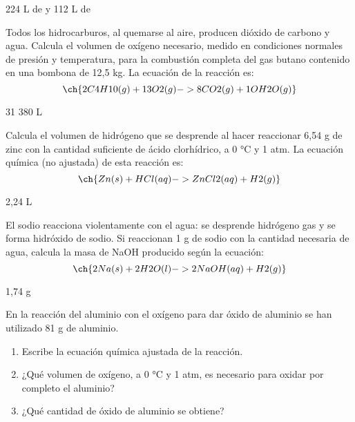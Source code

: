\documentclass[
]{article}
\providecommand{\tightlist}{%
  \setlength{\itemsep}{0pt}\setlength{\parskip}{0pt}}
\begin{document}
\begin{solution}224 L de  y 112 L de \end{solution}

\begin{exercise}[tags=OXF16] Todos los hidrocarburos, al quemarse al
aire, producen dióxido de carbono y agua. Calcula el volumen de oxígeno
necesario, medido en condiciones normales de presión y temperatura, para
la combustión completa del gas butano contenido en una bombona de 12,5
kg. La ecuación de la reacción es:
\[\ch{2 C4H10(g) + 13 O2(g) -> 8 CO2(g) + 1O H2O(g)}\]\end{exercise}

\begin{solution}31 380 L\end{solution}

\begin{exercise}[tags=OXF16] Calcula el volumen de hidrógeno que se
desprende al hacer reaccionar 6,54 g de zinc con la cantidad suficiente
de ácido clorhídrico, a 0 °C y 1 atm. La ecuación química (no ajustada)
de esta reacción es:
\[\ch{Zn(s) + HCl(aq) -> ZnCl2(aq) + H2(g)}\]\end{exercise}

\begin{solution}2,24 L\end{solution}

\begin{exercise}[tags=OXF16] El sodio reacciona violentamente con el
agua: se desprende hidrógeno gas y se forma hidróxido de sodio. Si
reaccionan 1 g de sodio con la cantidad necesaria de agua, calcula la
masa de NaOH producido según la ecuación:
\[\ch{2 Na(s) + 2 H2O(l) -> 2 NaOH(aq) + H2(g)}\]\end{exercise}

\begin{solution}1,74 g\end{solution}

\begin{exercise}[tags=OXF16] En la reacción del aluminio con el oxígeno
para dar óxido de aluminio se han utilizado 81 g de aluminio.

\begin{enumerate}
\def\labelenumi{\alph{enumi})}
\tightlist
\item
  Escribe la ecuación química ajustada de la reacción.
\item
  ¿Qué volumen de oxígeno, a 0 °C y 1 atm, es necesario para oxidar por
  completo el aluminio?
\item
  ¿Qué cantidad de óxido de aluminio se obtiene?
\end{enumerate}

\end{exercise}
\end{document}
